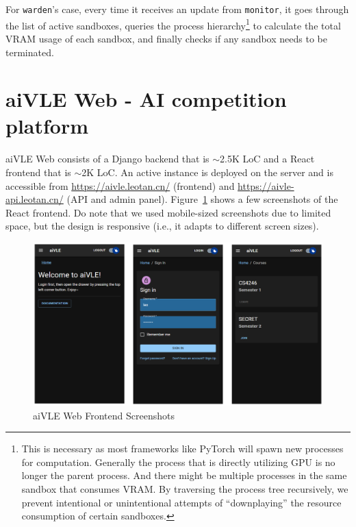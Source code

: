 For \texttt{warden}'s case, every time it receives an update from \texttt{monitor}, it goes through the list of active sandboxes, queries the process hierarchy\footnote{This is necessary as most frameworks like PyTorch will spawn new processes for computation. Generally the process that is directly utilizing GPU is no longer the parent process. And there might be multiple processes in the same sandbox that consumes VRAM. By traversing the process tree recursively, we prevent intentional or unintentional attempts of ``downplaying'' the resource consumption of certain sandboxes.} to calculate the total VRAM usage of each sandbox, and finally checks if any sandbox needs to be terminated.

\section{aiVLE Web - AI competition platform}
\label{ch:aivle-web}
aiVLE Web consists of a Django backend that is $\sim$2.5K LoC and a React frontend that is $\sim$2K LoC. An active instance is deployed on the server and is accessible from \href{https://aivle.leotan.cn/}{https://aivle.leotan.cn/} (frontend) and \href{https://aivle-api.leotan.cn/}{https://aivle-api.leotan.cn/} (API and admin panel). Figure~\ref{fig:aivle-web-frontend-screenshot} shows a few screenshots of the React frontend. Do note that we used mobile-sized screenshots due to limited space, but the design is responsive (i.e., it adapts to different screen sizes).

\begin{figure}[H]
    \centering
    \includegraphics[width=\textwidth]{images/aivle-web-frontend-screenshot.png}
    \caption{aiVLE Web Frontend Screenshots}
    \label{fig:aivle-web-frontend-screenshot}
\end{figure}

